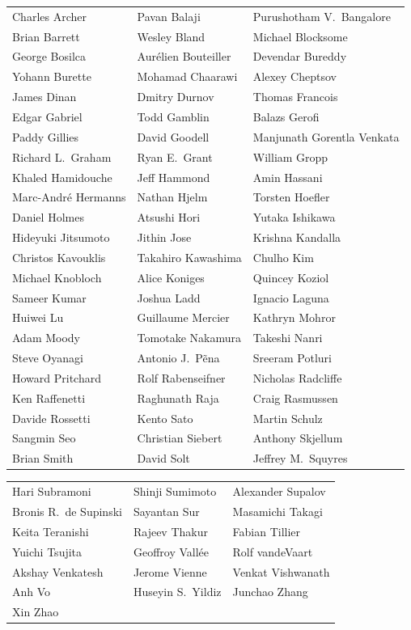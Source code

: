 \begin{center}
\begin{tabular}{lll}
Charles	Archer&
Pavan	Balaji&
Purushotham V.~Bangalore\\
Brian	Barrett&
Wesley	Bland&
Michael	Blocksome\\
George	Bosilca&
Aur\'elien	Bouteiller&
Devendar	Bureddy\\
Yohann	Burette &
Mohamad	Chaarawi&
Alexey	Cheptsov\\
James	Dinan&
Dmitry	Durnov&
Thomas	Francois\\
Edgar	Gabriel&
Todd	Gamblin&
Balazs	Gerofi\\
Paddy	Gillies&
David	Goodell&
Manjunath	Gorentla Venkata\\
Richard L.~Graham&
Ryan E.~Grant&
William	Gropp\\
Khaled	Hamidouche&
Jeff	Hammond&
Amin	Hassani\\
Marc-Andr\'e	Hermanns&
Nathan	Hjelm&
Torsten	Hoefler\\
Daniel	Holmes&
Atsushi	Hori&
Yutaka	Ishikawa\\
Hideyuki	Jitsumoto&
Jithin	Jose&
Krishna	Kandalla\\
Christos	Kavouklis&
Takahiro	Kawashima&
Chulho	Kim\\
Michael	Knobloch&
Alice	Koniges&
Quincey	Koziol\\
Sameer	Kumar&
Joshua	Ladd&
Ignacio	Laguna\\
Huiwei	Lu&
Guillaume	Mercier&
Kathryn	Mohror\\
Adam	Moody&
Tomotake	Nakamura&
Takeshi	Nanri\\
Steve	Oyanagi&
Antonio J.~P\~ena&
Sreeram	Potluri\\
Howard	Pritchard&
Rolf	Rabenseifner&
Nicholas	Radcliffe\\
Ken	Raffenetti&
Raghunath	Raja&
Craig	Rasmussen\\
Davide	Rossetti&
Kento	Sato&
Martin	Schulz\\
Sangmin	Seo&
Christian	Siebert&
Anthony	Skjellum\\
Brian	Smith&
David	Solt&
Jeffrey M.~Squyres\\
\end{tabular}
\end{center}
\begin{center}
\begin{tabular}{lll}
Hari	Subramoni&
Shinji	Sumimoto&
Alexander	Supalov\\
Bronis R.~de Supinski&
Sayantan	Sur&
Masamichi	Takagi\\
Keita	Teranishi&
Rajeev	Thakur&
Fabian	Tillier\\
Yuichi	Tsujita&
Geoffroy	Vall\'ee&
Rolf	vandeVaart\\
Akshay	Venkatesh&
Jerome	Vienne&
Venkat	Vishwanath\\
Anh	Vo&
Huseyin S.~Yildiz&
Junchao	Zhang\\
Xin	Zhao
\end{tabular}
\end{center}

